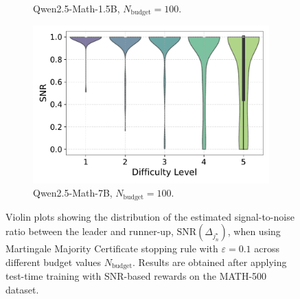 \begin{figure}[h!]
\begin{subfigure}{0.49\textwidth}
        \caption{Qwen2.5-Math-1.5B, $N_{\text{budget}}=100$.}
      \label{fig:QWEN-MATH-1.5B_budget_100_SNR_01}
  \end{subfigure}
  \hfill
  \begin{subfigure}{0.49\textwidth}
      \centering
      \includegraphics[width=\textwidth]{figs/QWEN-MATH-7B_violin_maj100_SNR_01.pdf}
        \caption{Qwen2.5-Math-7B, $N_{\text{budget}}=100$.}
      \label{fig:QWEN-MATH-7B_budget_100_SNR_01}
  \end{subfigure}
  \caption{Violin plots showing the distribution of the estimated signal-to-noise ratio between the leader and runner-up, $\text{SNR}(\Delta_{j^\star_n})$, when using Martingale Majority Certificate stopping rule with $\varepsilon = 0.1$ across different budget values $N_{\text{budget}}$. Results are obtained after applying test-time training with SNR-based rewards on the MATH-500 dataset.}
  \label{fig:violin_plots_SNR_ground_truth_01}
\end{figure}

